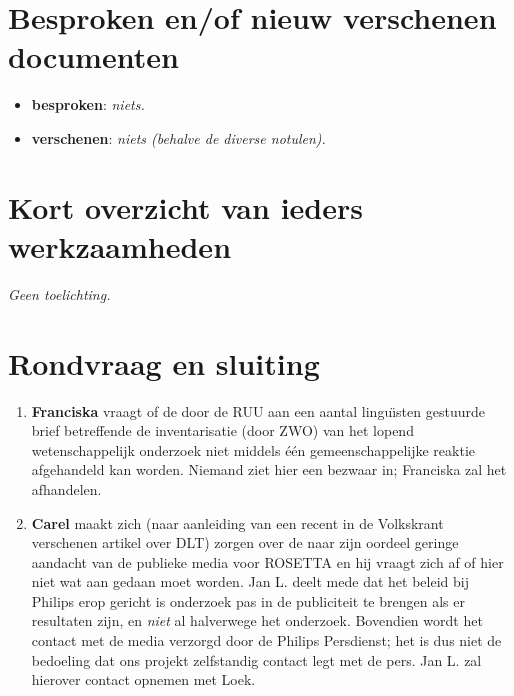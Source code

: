 \begin{itemize}
\section {Besproken en/of nieuw verschenen documenten}

\begin{itemize}
  \item {\bf besproken}: {\em niets.}
  \item {\bf verschenen}: {\em niets (behalve de diverse notulen).}
\end{itemize}

\section {Kort overzicht van ieders werkzaamheden}

{\em Geen toelichting.}

\section {Rondvraag en sluiting}
\begin{enumerate}
   \item {\bf Franciska} vraagt of de door de RUU aan een aantal 
lingu\"{\i}sten gestuurde brief betreffende de inventarisatie (door ZWO) 
van het lopend wetenschappelijk onderzoek niet middels \'{e}\'{e}n 
gemeenschappelijke reaktie afgehandeld kan worden. Niemand ziet hier een bezwaar
in; Franciska zal het afhandelen.
   \item {\bf Carel} maakt zich (naar aanleiding van een recent in de 
Volkskrant verschenen artikel over DLT) zorgen over de naar zijn oordeel 
geringe aandacht van de publieke media voor ROSETTA en hij vraagt zich af of 
hier niet wat aan gedaan moet worden. Jan L. deelt mede dat het beleid bij 
Philips erop gericht is onderzoek pas in de publiciteit te brengen als er 
resultaten zijn, en {\em niet} al halverwege het onderzoek. Bovendien wordt
het contact met de media verzorgd door de Philips Persdienst; het is dus niet de
bedoeling dat ons projekt zelfstandig contact legt met de pers. Jan L. zal 
hierover contact opnemen met Loek.
\end{enumerate}
\end{itemize}


